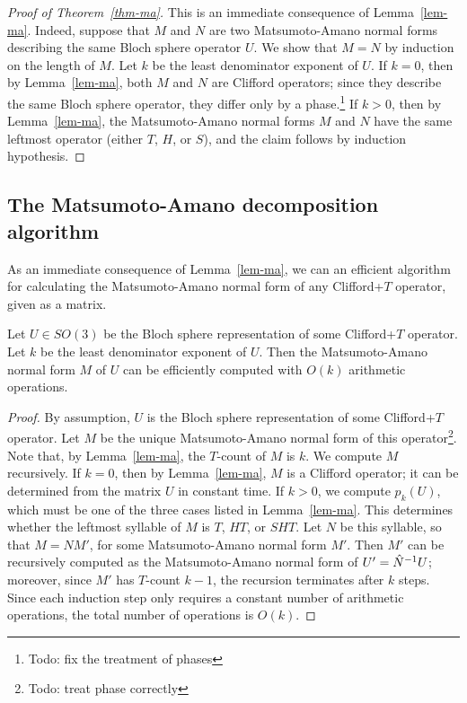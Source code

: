 \begin{proof}[Proof of Theorem~\ref{thm-ma}]
  This is an immediate consequence of Lemma~\ref{lem-ma}. Indeed, suppose that $M$ and $N$ are two
  Matsumoto-Amano normal forms describing the same Bloch sphere operator $U$. We show that $M=N$ by
  induction on the length of $M$. Let $k$ be the least denominator exponent of $U$. If $k=0$, then
  by Lemma~\ref{lem-ma}, both $M$ and $N$ are Clifford operators; since they describe the same
  Bloch sphere operator, they differ only by a phase.\footnote{Todo: fix the treatment of phases}
  If $k>0$, then by Lemma~\ref{lem-ma}, the Matsumoto-Amano normal forms $M$ and $N$ have the same
  leftmost operator (either $T$, $H$, or $S$), and the claim follows by induction hypothesis.
\end{proof}


\subsection{The Matsumoto-Amano decomposition algorithm} %
\label{sub:the_matsumoto_amano_decomposition_algorithm}
As an immediate consequence of Lemma~\ref{lem-ma}, we can an efficient algorithm for calculating
the Matsumoto-Amano normal form of any Clifford+$T$ operator, given as a matrix.

\begin{theorem}\label{thm:ma-decomposition}
  Let $U\in SO(3)$ be the Bloch sphere representation of some Clifford+$T$ operator. Let $k$ be the
  least denominator exponent of $U$. Then the Matsumoto-Amano normal form $M$ of $U$ can be
  efficiently computed with $O(k)$ arithmetic operations.
\end{theorem}

\begin{proof}
  By assumption, $U$ is the Bloch sphere representation of some Clifford+$T$ operator. Let $M$ be
  the unique Matsumoto-Amano normal form of this operator\footnote{Todo: treat phase correctly}.
  Note that, by Lemma~\ref{lem-ma}, the $T$-count of $M$ is $k$. We compute $M$ recursively. If
  $k=0$, then by Lemma~\ref{lem-ma}, $M$ is a Clifford operator; it can be determined from the
  matrix $U$ in constant time. If $k>0$, we compute $p_k(U)$, which must be one of the three cases
  listed in Lemma~\ref{lem-ma}. This determines whether the leftmost syllable of $M$ is $T$, $HT$,
  or $SHT$. Let $N$ be this syllable, so that $M=NM'$, for some Matsumoto-Amano normal form $M'$.
  Then $M'$ can be recursively computed as the Matsumoto-Amano normal form of $U'=\hat N^{-1} U$;
  moreover, since $M'$ has $T$-count $k-1$, the recursion terminates after $k$ steps. Since each
  induction step only requires a constant number of arithmetic operations, the total number of
  operations is $O(k)$.
\end{proof}

